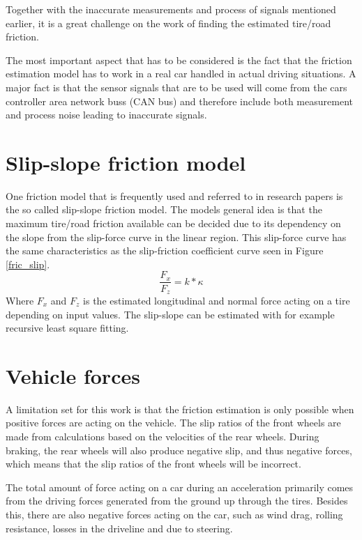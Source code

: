 Together with the inaccurate measurements and process of signals mentioned earlier, it is a great challenge on the work of finding the estimated tire/road friction.  


The most important aspect that has to be considered is the fact that the friction estimation model has to work in a real car handled in actual driving situations. A major fact is that the sensor signals that are to be used  will come from the cars controller area network buss (CAN bus) and therefore include both measurement and process noise leading to inaccurate signals. 


\section{Slip-slope friction model}

One friction model that is frequently used and referred to in research papers is the so called slip-slope friction model. The models general idea is that the maximum tire/road friction available can be decided due to its dependency on the slope from the slip-force curve in the linear region. This slip-force curve has the same characteristics as the slip-friction coefficient curve seen in Figure \ref{fric_slip}. 
\begin{equation}
\dfrac{F_{x}}{F_{z}} = k*\kappa
\end{equation}
Where $ F_{x} $ and $ F_{z} $ is the estimated longitudinal and normal force acting on a tire depending on input values. The slip-slope can be estimated with for example recursive least square fitting.

\section{Vehicle forces}

A limitation set for this work is that the friction estimation is only possible when positive forces are acting on the vehicle. The slip ratios of the front wheels are made from calculations based on the velocities of the rear wheels. During braking, the rear wheels will also produce negative slip, and thus negative forces, which means that the slip ratios of the front wheels will be incorrect. 

The total amount of force acting on a car during an acceleration primarily comes from the driving forces generated from the ground up through the tires. Besides this, there are also negative forces acting on the car, such as wind drag, rolling resistance, losses in the driveline and due to steering. 


